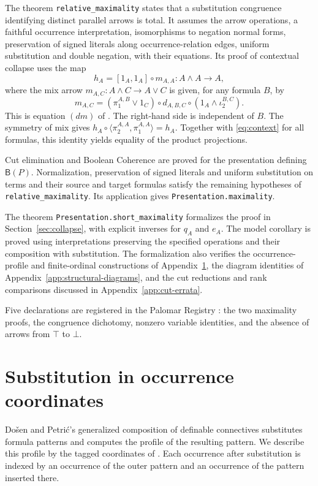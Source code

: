 \documentclass[11pt]{article}
\newcommand{\B}{\mathsf B}
\begin{document}
The theorem \texttt{relative\_maximality} states that a
substitution congruence identifying distinct parallel arrows is total.
It assumes the arrow operations, a faithful occurrence interpretation,
isomorphisms to negation normal forms, preservation of signed literals
along occurrence-relation edges, uniform substitution and double
negation, with their equations.
Its proof of contextual collapse uses the map
\[
 h_A=[1_A,1_A]\circ m_{A,A}:A\wedge A\longrightarrow A,
\]
where the mix arrow $m_{A,C}:A\wedge C\to A\vee C$ is given, for any
formula $B$, by
\[
 m_{A,C}=(\pi_1^{A,B}\vee1_C)\circ d_{A,B,C}
              \circ(1_A\wedge\iota_2^{B,C}).
\]
This is equation $(dm)$ of \cite[\S11.1, p.~234]{DP}.
The right-hand side is independent of $B$. The symmetry of mix gives
$h_A\circ\langle\pi_2^{A,A},\pi_1^{A,A}\rangle=h_A$.
Together with \eqref{eq:context} for all formulas, this identity yields
equality of the product projections.

Cut elimination and Boolean Coherence are proved for the presentation
defining $\B(P)$. Normalization, preservation of signed literals and
uniform substitution on terms and their source and target formulas
satisfy the remaining hypotheses of \texttt{relative\_maximality}.
Its application gives \texttt{Presentation.maximality}.

The theorem \texttt{Presentation.short\_maximality} formalizes the proof
in Section~\ref{sec:collapse}, with explicit inverses for $q_A$ and $e_A$.
The model corollary is proved using interpretations preserving the
specified operations and their composition with substitution. The formalization
also verifies the occurrence-profile and finite-ordinal constructions of
Appendix~\ref{app:substitution}, the diagram identities of
Appendix~\ref{app:structural-diagrams}, and the cut reductions and rank
comparisons discussed in Appendix~\ref{app:cut-errata}.

Five declarations are registered in the Palomar Registry
\cite{palomar-2026-10-30-000014-v1}:
the two maximality proofs, the congruence dichotomy, nonzero variable
identities, and the absence of arrows from $\top$ to $\bot$.

\appendix
\section{Substitution in occurrence coordinates}\label{app:substitution}

Do\v{s}en and Petri\'c's generalized composition of definable
connectives \cite[\S2.5, pp.~45--46]{DP} substitutes formula
patterns and computes the profile of the resulting pattern.
We describe this profile by the tagged coordinates of
\cite[\S\S9.2--9.3]{Notation}. Each occurrence after substitution
is indexed by an occurrence of the outer pattern and an occurrence
of the pattern inserted there.
\end{document}
